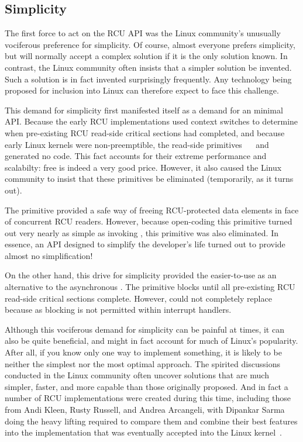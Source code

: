 \subsection{Simplicity}
\label{sec:app:rcuhist:Simplicity}

The first force to act on the RCU API was the Linux community's unusually
vociferous preference for simplicity.
Of course, almost everyone prefers simplicity, but will normally accept
a complex solution if it is the only solution known.
In contrast, the Linux community often insists
that a simpler solution be invented.
Such a solution is in fact invented surprisingly frequently.
Any technology being proposed for inclusion into Linux can therefore
expect to face this challenge.

This demand for simplicity first manifested itself
as a demand for an minimal API.
Because the early RCU implementations used context switches to determine
when pre-existing RCU read-side critical sections had completed, and
because early Linux kernels were non-preemptible, the read-side
primitives ~~
and ~
generated no code.
This fact
accounts for their extreme performance and scalabilty: free is indeed
a very good price.
However, it also caused the Linux community to
insist that these primitives be eliminated (temporarily, as it turns out).

The  primitive provided a safe way
of freeing RCU-protected data elements in face of concurrent RCU readers.
However, because
open-coding this primitive turned out very nearly as simple as invoking
,
this primitive was also eliminated.
In essence, an API designed to simplify the developer's life turned out
to provide almost no simplification!

On the other hand, this drive for simplicity provided
the easier-to-use
 as an alternative to the
asynchronous .
The  primitive blocks until all pre-existing
RCU read-side critical sections complete.
However,  could not completely replace
 because as blocking is not permitted within
interrupt handlers.

Although this vociferous demand for simplicity can be painful at times, it can
also be quite beneficial, and might in fact account for much of Linux's
popularity.
After all, if you know only one way to implement something, it is likely
to be neither the simplest nor the most optimal approach.
The spirited discussions conducted in the Linux community often
uncover solutions that are much simpler, faster, and more capable
than those originally proposed.
And in fact a number of RCU implementations were created during this time,
including those from Andi Kleen, Rusty Russell, and Andrea Arcangeli,
with Dipankar Sarma doing the heavy lifting required to compare
them and combine their best features into the implementation that
was eventually accepted into the
Linux kernel~\cite{Arcangeli03,McKenney01a,McKenney02a,Torvalds2.5.43}.

